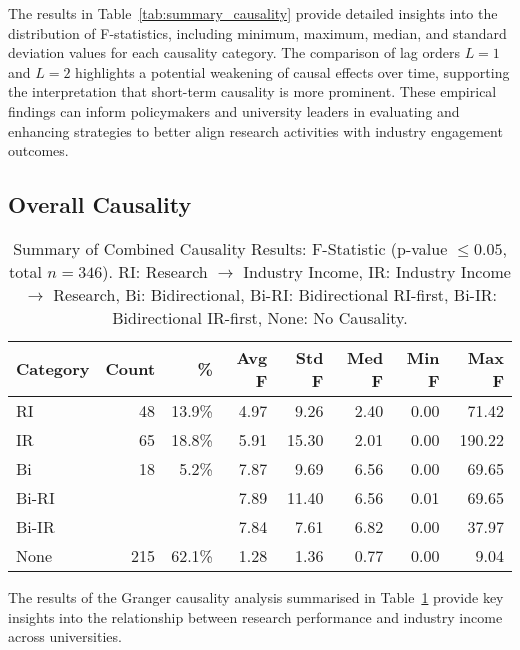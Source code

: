 \documentclass[a4paper, conference]{IEEEtran}
\begin{document}
The results in Table~\ref{tab:summary_causality} provide detailed insights into the distribution of F-statistics, including minimum, maximum, median, and standard deviation values for each causality category. The comparison of lag orders $L=1$ and $L=2$ highlights a potential weakening of causal effects over time, supporting the interpretation that short-term causality is more prominent. These empirical findings can inform policymakers and university leaders in evaluating and enhancing strategies to better align research activities with industry engagement outcomes.


\subsection{Overall Causality}
\begin{table}
	\centering
	\caption{Summary of Combined Causality Results: F-Statistic (p-value $\leq 0.05$, total $n=346$). RI: Research $\rightarrow$ Industry Income, IR: Industry Income $\rightarrow$ Research, Bi: Bidirectional, Bi-RI: Bidirectional RI-first, Bi-IR: Bidirectional IR-first, None: No Causality.}
	\label{tab:granger_overall}
	\begin{scriptsize}
		\begin{tabular}{|l|r|r|r|r|r|r|r|}
			\hline
			\textbf{Category} & \textbf{Count} & \textbf{\%} 
			& \textbf{Avg F} & \textbf{Std F} & \textbf{Med F} & \textbf{Min F} & \textbf{Max F} \\ \hline
			RI               & 48  & 13.9\% & 4.97  & 9.26  & 2.40  & 0.00  & 71.42 \\ \hline
			IR               & 65  & 18.8\% & 5.91  & 15.30 & 2.01  & 0.00  & 190.22 \\ \hline
			Bi               & 18  & 5.2\%  & 7.87  & 9.69  & 6.56  & 0.00  & 69.65 \\ \hline
			\hfill Bi-RI     &     &        & 7.89  & 11.40 & 6.56  & 0.01  & 69.65 \\ \hline
			\hfill Bi-IR     &     &        & 7.84  & 7.61  & 6.82  & 0.00  & 37.97 \\ \hline
			None            & 215 & 62.1\% & 1.28  & 1.36  & 0.77  & 0.00  & 9.04  \\ \hline
		\end{tabular}
	\end{scriptsize}
\end{table}


The results of the Granger causality analysis summarised in Table~\ref{tab:granger_overall} provide key insights into the relationship between research performance and industry income across universities.
\end{document}
